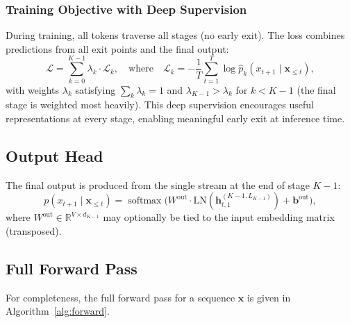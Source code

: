 \documentclass[11pt,a4paper]{article}
\theoremstyle{definition}
\theoremstyle{plain}
\theoremstyle{remark}
\newcommand{\R}{\mathbb{R}}
\newcommand{\Lcal}{\mathcal{L}}
\newcommand{\softmax}{\operatorname{softmax}}
\begin{document}
\subsubsection{Training Objective with Deep Supervision}

During training, all tokens traverse all stages (no early exit). The loss 
combines predictions from all exit points and the final output:
\begin{equation}\label{eq:loss}
  \Lcal = \sum_{k=0}^{K-1} \lambda_k \cdot \Lcal_k, 
  \quad\text{where}\quad 
  \Lcal_k = -\frac{1}{T}\sum_{t=1}^{T} 
  \log \hat{p}_k(x_{t+1} \mid \mathbf{x}_{\leq t}),
\end{equation}
with weights $\lambda_k$ satisfying $\sum_k \lambda_k = 1$ and 
$\lambda_{K-1} > \lambda_k$ for $k < K-1$ (the final stage is weighted 
most heavily). This deep supervision encourages useful representations at 
every stage, enabling meaningful early exit at inference time.

\subsection{Output Head}\label{sec:output}

The final output is produced from the single stream at the end of 
stage $K-1$:
\begin{equation}
  p(x_{t+1} \mid \mathbf{x}_{\leq t}) = 
  \softmax\bigl(W^{\text{out}} \cdot 
  \text{LN}(\mathbf{h}_{t,1}^{(K-1, L_{K-1})}) + 
  \mathbf{b}^{\text{out}}\bigr),
\end{equation}
where $W^{\text{out}} \in \R^{V \times d_{K-1}}$ may optionally be 
tied to the input embedding matrix (transposed).

\subsection{Full Forward Pass}\label{sec:forward}

For completeness, the full forward pass for a sequence $\mathbf{x}$ is 
given in Algorithm~\ref{alg:forward}.
\end{document}
